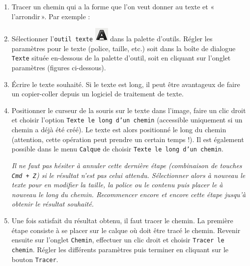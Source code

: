 \begin{enumerate}
\item Tracer un chemin qui a la forme que l'on veut donner au texte et «\,l'arrondir\,». Par exemple :


\item Sélectionner l'\texttt{outil texte} \includegraphics[width=.6cm]{./images/image03/iconeTexte} dans la palette d'outils. Régler les paramètres pour le texte (police, taille, etc.) soit dans la boîte de dialogue \texttt{Texte} située en-dessous de la palette d'outil, soit en cliquant sur l'onglet paramètres (figures ci-dessous).


\item Écrire le texte souhaité. Si le texte est long, il peut être avantageux de faire un copier-coller depuis un logiciel de traitement de texte. 

\item Positionner le curseur de la souris sur le texte dans l'image, faire un clic droit et choisir l'option \texttt{Texte le long d'un chemin} (accessible uniquement si un chemin a déjà été créé). Le texte est alors positionné le long du chemin (attention, cette opération peut prendre un certain temps !). Il est également possible dans le menu \texttt{Calque} de choisir \texttt{Texte le long d'un chemin}. 

\emph{Il ne faut pas hésiter à annuler cette dernière étape (combinaison de touches \texttt{Cmd + Z}) si le résultat n'est pas celui attendu. Sélectionner alors à nouveau le texte pour en modifier la taille, la police ou le contenu puis placer le à nouveau le long du chemin. Recommencer encore et encore cette étape jusqu'à obtenir le résultat souhaité.}

\vspace{6pt}

\item Une fois satisfait du résultat obtenu, il faut tracer le chemin. La première étape consiste à se placer sur le calque où doit être tracé le chemin. Revenir ensuite sur l'onglet \texttt{Chemin}, effectuer un clic droit et choisir \texttt{Tracer le chemin}. Régler les différents paramètres puis terminer en cliquant sur le bouton \texttt{Tracer}. 


\end{enumerate}
